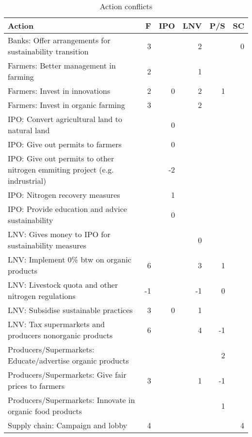 \begin{table}
\caption{Action conflicts}
\begin{tabular}{|l|r|r|r|r|r|}
\hline
Action & F & IPO & LNV & P/S & SC \\
\hline
Banks: Offer arrangements for sustainability transition & 3 &  & 2 &  & 0 \\
Farmers: Better management in farming & 2 &  & 1 &  &  \\
Farmers: Invest in innovations & 2 & 0 & 2 & 1 &  \\
Farmers: Invest in organic farming & 3 &  & 2 &  &  \\
IPO: Convert agricultural land to natural land &  & 0 &  &  &  \\
IPO: Give out permits to farmers &  & 0 &  &  &  \\
IPO: Give out permits to other nitrogen emmiting project (e.g. indrustrial) &  & -2 &  &  &  \\
IPO: Nitrogen recovery measures &  & 1 &  &  &  \\
IPO: Provide education and advice sustainability &  & 0 &  &  &  \\
LNV: Gives money to IPO for sustainability measures &  &  & 0 &  &  \\
LNV: Implement 0\% btw on organic products & 6 &  & 3 & 1 &  \\
LNV: Livestock quota and other nitrogen regulations & -1 &  & -1 & 0 &  \\
LNV: Subsidise sustainable practices & 3 & 0 & 1 &  &  \\
LNV: Tax supermarkets and producers nonorganic products & 6 &  & 4 & -1 &  \\
Producers/Supermarkets: Educate/advertise organic products &  &  &  & 2 &  \\
Producers/Supermarkets: Give fair prices to farmers & 3 &  & 1 & -1 &  \\
Producers/Supermarkets: Innovate in organic food products &  &  &  & 1 &  \\
Supply chain: Campaign and lobby & 4 &  &  &  & 4 \\
\hline
\end{tabular}
\end{table}
